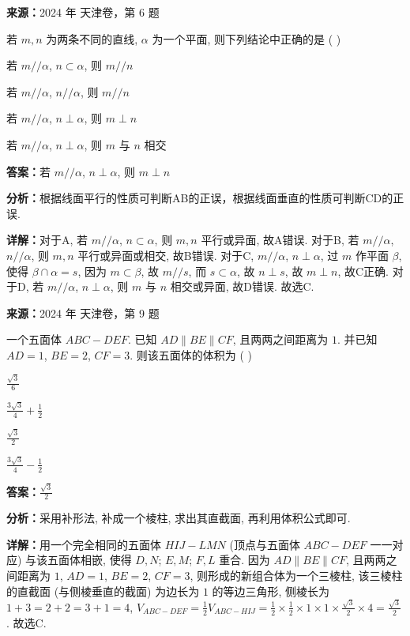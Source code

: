 \begin{question}[points=5]
\textbf{来源：}2024 年 天津卷，第 6 题\par
若 $m,n$ 为两条不同的直线, $\alpha$ 为一个平面, 则下列结论中正确的是 ( )
\begin{choices}
  \item 若 $m // \alpha$, $n \subset \alpha$, 则 $m // n$
  \item 若 $m // \alpha$, $n // \alpha$, 则 $m // n$
  \item 若 $m // \alpha$, $n \perp \alpha$, 则 $m \perp n$
  \item 若 $m // \alpha$, $n \perp \alpha$, 则 $m$ 与 $n$ 相交
\end{choices}
\begin{solution}
\textbf{答案：}若 $m // \alpha$, $n \perp \alpha$, 则 $m \perp n$

\textbf{分析：}根据线面平行的性质可判断AB的正误，根据线面垂直的性质可判断CD的正误.

\textbf{详解：}对于A, 若 $m // \alpha$, $n \subset \alpha$, 则 $m,n$ 平行或异面, 故A错误. 对于B, 若 $m // \alpha$, $n // \alpha$, 则 $m,n$ 平行或异面或相交, 故B错误. 对于C, $m // \alpha$, $n \perp \alpha$, 过 $m$ 作平面 $\beta$, 使得 $\beta \cap \alpha = s$, 因为 $m \subset \beta$, 故 $m // s$, 而 $s \subset \alpha$, 故 $n \perp s$, 故 $m \perp n$, 故C正确. 对于D, 若 $m // \alpha$, $n \perp \alpha$, 则 $m$ 与 $n$ 相交或异面, 故D错误. 故选C.
\end{solution}
\end{question}

\begin{question}[points=5]
\textbf{来源：}2024 年 天津卷，第 9 题\par
一个五面体 $ABC-DEF$. 已知 $AD \parallel BE \parallel CF$, 且两两之间距离为 $1$. 并已知 $AD=1$, $BE=2$, $CF=3$. 则该五面体的体积为 ( )
\begin{choices}
  \item $\frac{\sqrt{3}}{6}$
  \item $\frac{3\sqrt{3}}{4}+\frac{1}{2}$
  \item $\frac{\sqrt{3}}{2}$
  \item $\frac{3\sqrt{3}}{4}-\frac{1}{2}$
\end{choices}
\begin{solution}
\textbf{答案：}$\frac{\sqrt{3}}{2}$

\textbf{分析：}采用补形法, 补成一个棱柱, 求出其直截面, 再利用体积公式即可.

\textbf{详解：}用一个完全相同的五面体 $HIJ-LMN$ (顶点与五面体 $ABC-DEF$ 一一对应) 与该五面体相嵌, 使得 $D,N$; $E,M$; $F,L$ 重合. 因为 $AD \parallel BE \parallel CF$, 且两两之间距离为 $1$, $AD=1$, $BE=2$, $CF=3$, 则形成的新组合体为一个三棱柱, 该三棱柱的直截面 (与侧棱垂直的截面) 为边长为 $1$ 的等边三角形, 侧棱长为 $1+3=2+2=3+1=4$, $V_{ABC-DEF}=\frac{1}{2}V_{ABC-HIJ}=\frac{1}{2}\times\frac{1}{2}\times 1\times 1\times \frac{\sqrt{3}}{2}\times 4=\frac{\sqrt{3}}{2}$. 故选C.
\end{solution}
\end{question}

